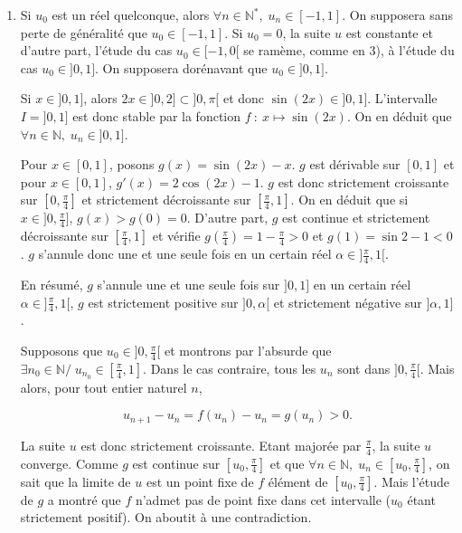 \documentclass[11pt,a4paper]{article}
\newcommand{\Nn}{\mathbb{N}} \newcommand{\N}{\mathbb{N}}
\begin{document}
\begin{enumerate}
Comme $0\leq\sin1<1$, la suite $(\sin1)^n$ converge vers $0$, et donc la suite $(u_n)_{n\in\Nn}$ converge vers $\alpha$. On peut noter que puisque la fonction $x\mapsto\cos x$ est strictement décroissante sur $[0,1]$, les deux suites $(u_{2n})_{n\in\Nn}$ et $(u_{2n+1})_{n\in\Nn}$ sont strictement monotones, de sens de variations contraires (dans le cas où $u_0\in[0,1]$. On peut noter également que si $n>\frac{\ln(10^{-2})}{\ln(\sin1)}=26,6...$, alors $(\sin1)^n<10^{-2}$. Par suite, $u_{27}$ est une valeur approchée de $\alpha$ à $10^{-2}$ près. La machine fournit $\alpha=0,73...$ (et même $\alpha=0,739087042.....$).


\item  Si $u_0$ est un réel quelconque, alors $\forall n\in\Nn^*,\;u_n\in[-1,1]$. On supposera sans perte de généralité que $u_0\in[-1,1]$. Si $u_0=0$, la suite $u$ est constante et d'autre part, l'étude du cas $u_0\in[-1,0[$ se ramème, comme en 3), à l'étude du cas $u_0\in]0,1]$. On supposera dorénavant que $u_0\in]0,1]$.

Si $x\in]0,1]$, alors $2x\in]0,2]\subset]0,\pi[$ et donc $\sin(2x)\in]0,1]$. L'intervalle $I=]0,1]$ est donc stable par la fonction $f~:~x\mapsto\sin(2x)$. On en déduit que $\forall n\in\Nn,\;u_n\in]0,1]$.

Pour $x\in[0,1]$, posons $g(x)=\sin(2x)-x$. $g$ est dérivable sur $[0,1]$ et pour $x\in[0,1]$, $g'(x)=2\cos(2x)-1$. $g$ est donc strictement croissante sur $[0,\frac{\pi}{4}]$ et strictement décroissante sur $[\frac{\pi}{4},1]$. On en déduit que si $x\in]0,\frac{\pi}{4}]$, $g(x)>g(0)=0$. D'autre part, $g$ est continue et strictement décroissante sur $[\frac{\pi}{4},1]$ et vérifie $g(\frac{\pi}{4})=1-\frac{\pi}{4}>0$ et $g(1)=\sin2-1<0$. $g$ s'annule donc une et une seule fois en un certain réel $\alpha\in]\frac{\pi}{4},1[$.

En résumé, $g$ s'annule une et une seule fois sur $]0,1]$ en un certain réel $\alpha\in]\frac{\pi}{4},1[$, $g$ est strictement positive sur $]0,\alpha[$ et strictement négative sur $]\alpha,1]$.

Supposons que $u_0\in]0,\frac{\pi}{4}[$ et montrons par l'absurde que $\exists n_0\in\Nn/\;u_{n_0}\in[\frac{\pi}{4},1]$. Dans le cas contraire, tous les $u_n$ sont dans $]0,\frac{\pi}{4}[$. Mais alors, pour tout entier naturel $n$,

$$u_{n+1}-u_n=f(u_n)-u_n=g(u_n)>0.$$

La suite $u$ est donc strictement croissante. Etant majorée par $\frac{\pi}{4}$, la suite $u$ converge. Comme $g$ est continue sur $[u_0,\frac{\pi}{4}]$ et que $\forall n\in\Nn,\;u_n\in[u_0,\frac{\pi}{4}]$, on sait que la limite de $u$ est un point fixe de $f$ élément de $[u_0,\frac{\pi}{4}]$. Mais l'étude de $g$ a montré que $f$ n'admet pas de point fixe dans cet intervalle ($u_0$ étant strictement positif). On aboutit à une contradiction.


\end{enumerate}
\end{document}

